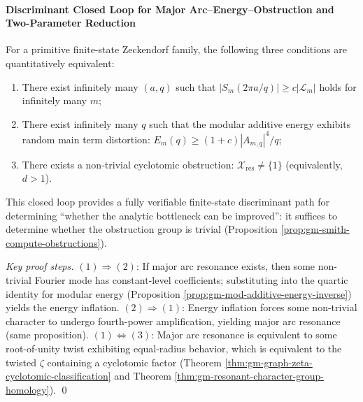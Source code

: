 \paragraph{Discriminant Closed Loop for Major Arc--Energy--Obstruction and Two-Parameter Reduction}
\begin{theorem}\label{thm:gm-majorarc-energy-obstruction-loop}
For a primitive finite-state Zeckendorf family, the following three conditions are quantitatively equivalent:
\begin{enumerate}
  \item There exist infinitely many \((a,q)\) such that \(|S_m(2\pi a/q)|\ge c|\mathcal{L}_m|\) holds for infinitely many \(m\);
  \item There exist infinitely many \(q\) such that the modular additive energy exhibits random main term distortion: \(E_m(q)\ge (1+c)|A_{m,q}|^4/q\);
  \item There exists a non-trivial cyclotomic obstruction: \(\mathcal{X}_{\mathrm{res}}\neq\{1\}\) (equivalently, \(d>1\)).
\end{enumerate}
This closed loop provides a fully verifiable finite-state discriminant path for determining ``whether the analytic bottleneck can be improved'': it suffices to determine whether the obstruction group is trivial (Proposition \ref{prop:gm-smith-compute-obstructions}).
\end{theorem}

\begin{proof}[Key proof steps]
\((1)\Rightarrow(2)\): If major arc resonance exists, then some non-trivial Fourier mode has constant-level coefficients; substituting into the quartic identity for modular energy (Proposition \ref{prop:gm-mod-additive-energy-inverse}) yields the energy inflation.
\((2)\Rightarrow(1)\): Energy inflation forces some non-trivial character to undergo fourth-power amplification, yielding major arc resonance (same proposition).
\((1)\Leftrightarrow(3)\): Major arc resonance is equivalent to some root-of-unity twist exhibiting equal-radius behavior, which is equivalent to the twisted \(\zeta\) containing a cyclotomic factor (Theorem \ref{thm:gm-graph-zeta-cyclotomic-classification} and Theorem \ref{thm:gm-resonant-character-group-homology}). \qed
\end{proof}

